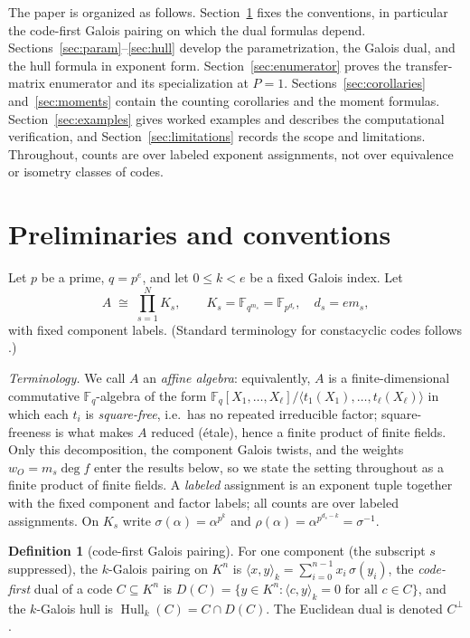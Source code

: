 \documentclass[10pt,journal,draftclsnofoot,onecolumn]{IEEEtran}
\theoremstyle{definition}
\newtheorem{definition}[theorem]{Definition}
\theoremstyle{remark}
\newcommand{\Fq}{\mathbb{F}_q}
\newcommand{\Hull}{\operatorname{Hull}}
\begin{document}
The paper is organized as follows. Section~\ref{sec:prelim} fixes the
conventions, in particular the code-first Galois pairing on which the
dual formulas depend. Sections~\ref{sec:param}--\ref{sec:hull}
develop the parametrization, the Galois dual, and the hull formula in
exponent form. Section~\ref{sec:enumerator} proves the
transfer-matrix enumerator and its specialization at \(P=1\).
Sections~\ref{sec:corollaries} and~\ref{sec:moments} contain the
counting corollaries and the moment formulas.
Section~\ref{sec:examples} gives worked examples and describes the
computational verification, and Section~\ref{sec:limitations} records
the scope and limitations. Throughout, counts are over labeled
exponent assignments, not over equivalence or isometry classes of
codes.

\section{Preliminaries and conventions}\label{sec:prelim}

Let \(p\) be a prime, \(q = p^e\), and let \(0 \le k < e\) be a fixed
Galois index. Let
\[
A \;\cong\; \prod_{s=1}^{N} K_s, \qquad
K_s = \mathbb{F}_{q^{m_s}} = \mathbb{F}_{p^{d_s}}, \quad d_s = e m_s,
\]
with fixed component labels. (Standard terminology for constacyclic codes
follows \cite{HP2003, MS1977}.)

\emph{Terminology.} We call \(A\) an \emph{affine algebra}: equivalently,
\(A\) is a finite-dimensional commutative \(\Fq\)-algebra of the form
\(\Fq[X_1,\dots,X_\ell]/\langle t_1(X_1),\dots,t_\ell(X_\ell)\rangle\)
in which each \(t_i\) is \emph{square-free}, i.e.\ has no repeated
irreducible factor; square-freeness is what makes \(A\) reduced
(\'etale), hence a finite product of finite fields. Only this
decomposition, the component Galois twists, and the weights
\(w_O = m_s \deg f\) enter the results below, so we state the setting
throughout as a finite product of finite fields. A \emph{labeled}
assignment is an exponent tuple together with the fixed component and
factor labels; all counts are over labeled assignments. On \(K_s\) write
\(\sigma(\alpha) = \alpha^{p^k}\) and
\(\rho(\alpha) = \alpha^{p^{d_s - k}} = \sigma^{-1}\).

\begin{definition}[code-first Galois pairing]
For one component (the subscript \(s\) suppressed), the \(k\)-Galois
pairing on \(K^n\) is
\(\langle x, y \rangle_k = \sum_{i=0}^{n-1} x_i \, \sigma(y_i)\),
the \emph{code-first} dual of a code \(C \subseteq K^n\) is
\(D(C) = \{ y \in K^n : \langle c, y \rangle_k = 0 \text{ for all } c \in C\}\),
and the \(k\)-Galois hull is \(\Hull_k(C) = C \cap D(C)\).
The Euclidean dual is denoted \(C^\perp\).
\end{definition}
\end{document}
